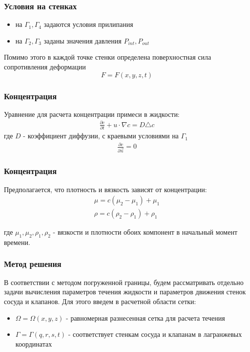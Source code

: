 \documentclass[14pt]{beamer}
\begin{document}
\begin{frame}
\frametitle{Условия на стенках}
\begin{itemize}
    \item на $\Gamma_1,\Gamma_4$ задаются условия прилипания
    \item на $\Gamma_2,\Gamma_3$ заданы значения давления $P_{int},P_{out}$
\end{itemize}

Помимо этого в каждой точке стенки определена поверхностная сила сопротивления деформации
\begin{equation*}
    \label{eq:define_boundary_force}
    F = F(x, y, z, t)
\end{equation*}

\end{frame}

\begin{frame}
\frametitle{Концентрация}
Уравнение для расчета концентрации примеси в жидкости:
\begin{gather}
    \label{eq:concentration}
    \frac{\partial c}{\partial t} + u \cdot \nabla c = D \triangle c
\end{gather}
где $D$ - коэффициент диффузии, с краевыми условиями на $\Gamma_1$
\begin{gather}
    \frac{\partial c}{\partial \vec{n}} = 0
\end{gather}

\end{frame}

\begin{frame}
\frametitle{Концентрация}
Предполагается, что плотность и вязкость зависят от концентрации:
\begin{gather}
    \label{eq:concentration_viscosity}
    \mu = c (\mu_2 - \mu_1) + \mu_1\\
    \label{eq:concentration_density}
    \rho = c (\rho_2 - \rho_1) + \rho_1
\end{gather}

где $\mu_1, \mu_2, \rho_1, \rho_2$ - вязкости и плотности обоих компонент в начальный момент времени.
\end{frame}

\begin{frame}
\frametitle{Метод решения}
В соответствии с методом погруженной границы, будем рассматривать отдельно задачи вычисления параметров течения жидкости и параметров движения стенок сосуда и клапанов. Для этого введем в расчетной области сетки:
\begin{itemize}
    \item $\Omega = \Omega(x, y, z)$ - равномерная разнесенная сетка для расчета течения
    \item $\Gamma = \Gamma(q, r, s, t)$ - соответствует стенкам сосуда и клапанам в лагранжевых координатах
\end{itemize}

\end{frame}
\end{document}
